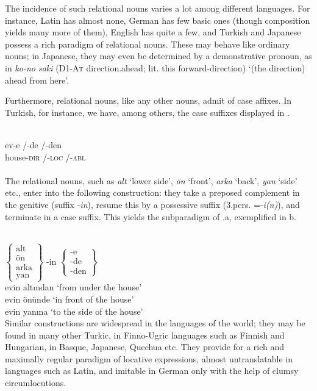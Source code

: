 The incidence of such relational nouns varies a lot among different languages. For instance, Latin has almost none, German has few basic ones (though composition yields many more of them), English has quite a few, and Turkish and Japanese possess a rich paradigm of relational nouns. These may behave like ordinary nouns; in Japanese, they may even be determined by a demonstrative pronoun, as in \textit{ko-no saki} (D1-\textsc{At} direction.ahead; lit. this forward-direction) ‘(the direction) ahead from here’.

Furthermore, relational nouns, like any other nouns, admit of case affixes. In Turkish, for instance, we have, among others, the case suffixes displayed in .

\ea\label{ex:E49}
\langinfo{\LangTurk}{}{}\\
\gll   ev-e  /-de  /-den\\
 house-\textsc{dir}  /-\textsc{loc}  /-\textsc{abl}\\
\\
\z
\noindent The relational nouns, such as \textit{alt} ‘lower side’, \textit{ön} ‘front’, \textit{arka} ‘back’, \textit{yan} ‘side’ etc., enter into the following construction: they take a preposed complement in the genitive (suffix -\textit{in}), resume this by a possessive suffix (3.pers. =-\textit{i(n)}), and terminate in a case suffix. This yields the subparadigm of .a, exemplified in b.

\ea\label{ex:E50}
  \\
  $\left\{\begin{array}{c}\text{alt}\\ \text{ön}\\ \text{arka}\\ \text{yan}\end{array}\right\}$   {-in}  
 $\left\{\begin{array}{c}\text{-e}\\ \text{-de}\\ \text{-den}\end{array}\right\}$ \\
\ex  evin altından  {\rm ‘from under the house’}\\
evin önünde  {\rm ‘in front of the house’}\\
evin yanına  {\rm ‘to the side of the house’} \\
\z
\z
\noindent Similar constructions are widespread in the languages of the world; they may be found in many other Turkic, in Finno-Ugric languages such as Finnish and Hungarian, in Basque, Japanese, Quechua etc. They provide for a rich and maximally regular paradigm of locative expressions, almost untranslatable in languages such as Latin, and imitable in German only with the help of clumsy circumlocutions.

